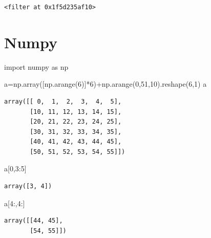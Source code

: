 \documentclass[
  letterpaper,
  DIV=11,
  numbers=noendperiod]{scrreprt}
\newenvironment{Shaded}{\begin{snugshade}}{\end{snugshade}}
\newcommand{\DecValTok}[1]{\textcolor[rgb]{0.68,0.00,0.00}{#1}}
\newcommand{\ImportTok}[1]{\textcolor[rgb]{0.00,0.46,0.62}{#1}}
\newcommand{\NormalTok}[1]{\textcolor[rgb]{0.00,0.23,0.31}{#1}}
\newcommand{\OperatorTok}[1]{\textcolor[rgb]{0.37,0.37,0.37}{#1}}
\begin{document}
\begin{verbatim}
<filter at 0x1f5d235af10>
\end{verbatim}

\chapter{Numpy}\label{numpy}

\begin{Shaded}
\begin{Highlighting}[]
\ImportTok{import}\NormalTok{ numpy }\ImportTok{as}\NormalTok{ np}
\end{Highlighting}
\end{Shaded}

\begin{Shaded}
\begin{Highlighting}[]
\NormalTok{a}\OperatorTok{=}\NormalTok{np.array([np.arange(}\DecValTok{6}\NormalTok{)]}\OperatorTok{*}\DecValTok{6}\NormalTok{)}\OperatorTok{+}\NormalTok{np.arange(}\DecValTok{0}\NormalTok{,}\DecValTok{51}\NormalTok{,}\DecValTok{10}\NormalTok{).reshape(}\DecValTok{6}\NormalTok{,}\DecValTok{1}\NormalTok{)}
\NormalTok{a}
\end{Highlighting}
\end{Shaded}

\begin{verbatim}
array([[ 0,  1,  2,  3,  4,  5],
       [10, 11, 12, 13, 14, 15],
       [20, 21, 22, 23, 24, 25],
       [30, 31, 32, 33, 34, 35],
       [40, 41, 42, 43, 44, 45],
       [50, 51, 52, 53, 54, 55]])
\end{verbatim}

\begin{Shaded}
\begin{Highlighting}[]
\NormalTok{a[}\DecValTok{0}\NormalTok{,}\DecValTok{3}\NormalTok{:}\DecValTok{5}\NormalTok{]}
\end{Highlighting}
\end{Shaded}

\begin{verbatim}
array([3, 4])
\end{verbatim}

\begin{Shaded}
\begin{Highlighting}[]
\NormalTok{a[}\DecValTok{4}\NormalTok{:,}\DecValTok{4}\NormalTok{:]}
\end{Highlighting}
\end{Shaded}

\begin{verbatim}
array([[44, 45],
       [54, 55]])
\end{verbatim}
\end{document}
